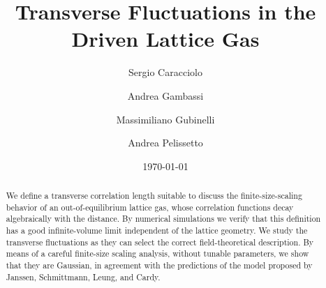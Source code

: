 \documentclass[aps,prl,twocolumn,floatfix,amssymb]{revtex4}
\begin{document}
 
 
 
\title{Transverse Fluctuations in the Driven Lattice Gas} 
 
\author{Sergio Caracciolo} 
\author{Andrea Gambassi} 
\author{Massimiliano Gubinelli} 
\author{Andrea Pelissetto} 
 
 
\date{\today} 
\begin{abstract} 
We define a transverse correlation length 
suitable to discuss the finite-size-scaling behavior of an out-of-equilibrium 
lattice gas, whose 
correlation functions decay algebraically with the distance. 
By numerical simulations we verify that this definition has a 
good infinite-volume limit independent of the lattice geometry. 
We study the transverse fluctuations as they can select the correct
field-theoretical description. By means of a careful finite-size
scaling analysis, without tunable parameters, we show that they are Gaussian,
in agreement with the predictions of the model proposed by  Janssen,
Schmittmann, Leung, and Cardy.  
\end{abstract} 
 
 
 
\maketitle 
 
 
\end{document}
